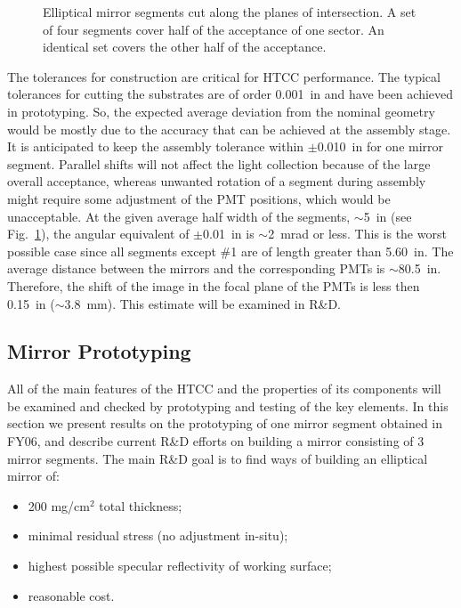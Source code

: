\begin{figure}
\begin{center}
\caption{\small{Elliptical mirror segments cut along the planes of 
intersection.  A set of four segments cover half of the acceptance of one 
sector.  An identical set covers the other half of the acceptance.}}
\label{mirror}
\end{center}
\end{figure} 

The tolerances for construction are critical for HTCC performance. 
The typical tolerances for cutting the substrates are of order 0.001~in 
and have been achieved in prototyping.  So, the expected average
deviation from the nominal geometry would be mostly due to the accuracy that 
can be achieved at the assembly stage.  It is anticipated to keep the assembly 
tolerance within $\pm$0.010~in for one mirror segment.  Parallel shifts 
will not affect the light collection because of the large overall acceptance,
whereas unwanted rotation of a segment during assembly might require some 
adjustment of the PMT positions, which would be unacceptable.  At the given 
average half width of the segments, $\sim$5~in (see Fig.~\ref{mirror}), the
angular equivalent of $\pm$0.01~in is $\sim$2~mrad or less.  This is the 
worst possible case since all segments except \#1 are of length greater than 
5.60~in.  The average distance between the mirrors and the corresponding PMTs 
is $\sim$80.5~in. Therefore, the shift of the image in the focal plane of 
the PMTs is less then 0.15~in ($\sim$3.8~mm). This estimate will be
examined in R\&D. 

\subsection{Mirror Prototyping}
\label{Mirror}
 
All of the main features of the HTCC and the properties of its components 
will be examined and checked by prototyping and testing of the key elements. 
In this section we present results on the prototyping of one mirror segment 
obtained in FY06, and describe current R\&D efforts on building a mirror 
consisting of 3 mirror segments.  The main R\&D goal is to find ways of 
building an elliptical mirror of:

\begin{itemize}
\item 200 mg/cm$^2$ total thickness;
\item minimal residual stress (no adjustment in-situ);
\item highest possible specular reflectivity of working surface;
\item reasonable cost.
\end{itemize}

